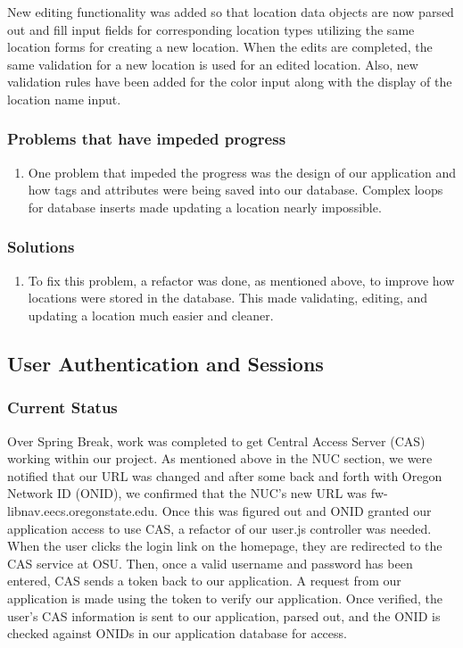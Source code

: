 \documentclass[letterpaper,10pt,serif,titlepage, onecolumn, compsoc]{IEEEtran}
\begin{document}
New editing functionality was added so that location data objects are now parsed out and fill input fields for corresponding location types utilizing the same location forms for creating a new location. When the edits are completed, the same validation for a new location is used for an edited location. Also, new validation rules have been added for the color input along with the display of the location name input. 

\subsubsection{Problems that have impeded progress}
\begin{enumerate}
	\item  One problem that impeded the progress was the design of our application and how tags and attributes were being saved into our database. Complex loops for database inserts made updating a location nearly impossible. 
\end{enumerate}

\subsubsection{Solutions}
\begin{enumerate}
	\item To fix this problem, a refactor was done, as mentioned above, to improve how locations were stored in the database. This made validating, editing, and updating a location much easier and cleaner. 
\end{enumerate}

\subsection{User Authentication and Sessions}
\subsubsection{Current Status}
Over Spring Break, work was completed to get Central Access Server (CAS) working within our project. As mentioned above in the NUC section, we were notified that our URL was changed and after some back and forth with Oregon Network ID (ONID), we confirmed that the NUC’s new URL was fw-libnav.eecs.oregonstate.edu. Once this was figured out and ONID granted our application access to use CAS, a refactor of our user.js controller was needed. When the user clicks the login link on the homepage, they are redirected to the CAS service at OSU. Then, once a valid username and password has been entered, CAS sends a token back to our application. A request from our application is made using the token to verify our application. Once verified, the user’s CAS information is sent to our application, parsed out, and the ONID is checked against ONIDs in our application database for access. 
\end{document}
